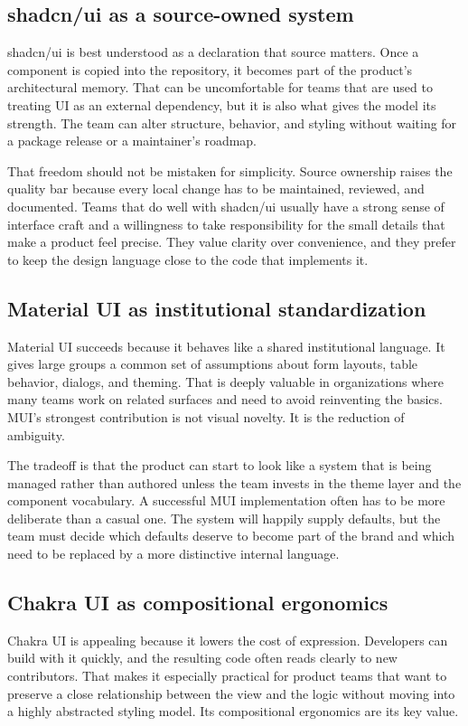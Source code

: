 \documentclass[11pt,twoside,a4paper]{article}
\begin{document}
\subsection{shadcn/ui as a source-owned system}
shadcn/ui is best understood as a declaration that source matters. Once a component is copied into the repository, it becomes part of the product's architectural memory. That can be uncomfortable for teams that are used to treating UI as an external dependency, but it is also what gives the model its strength. The team can alter structure, behavior, and styling without waiting for a package release or a maintainer's roadmap.

That freedom should not be mistaken for simplicity. Source ownership raises the quality bar because every local change has to be maintained, reviewed, and documented. Teams that do well with shadcn/ui usually have a strong sense of interface craft and a willingness to take responsibility for the small details that make a product feel precise. They value clarity over convenience, and they prefer to keep the design language close to the code that implements it.

\subsection{Material UI as institutional standardization}
Material UI succeeds because it behaves like a shared institutional language. It gives large groups a common set of assumptions about form layouts, table behavior, dialogs, and theming. That is deeply valuable in organizations where many teams work on related surfaces and need to avoid reinventing the basics. MUI's strongest contribution is not visual novelty. It is the reduction of ambiguity.

The tradeoff is that the product can start to look like a system that is being managed rather than authored unless the team invests in the theme layer and the component vocabulary. A successful MUI implementation often has to be more deliberate than a casual one. The system will happily supply defaults, but the team must decide which defaults deserve to become part of the brand and which need to be replaced by a more distinctive internal language.

\subsection{Chakra UI as compositional ergonomics}
Chakra UI is appealing because it lowers the cost of expression. Developers can build with it quickly, and the resulting code often reads clearly to new contributors. That makes it especially practical for product teams that want to preserve a close relationship between the view and the logic without moving into a highly abstracted styling model. Its compositional ergonomics are its key value.
\end{document}
